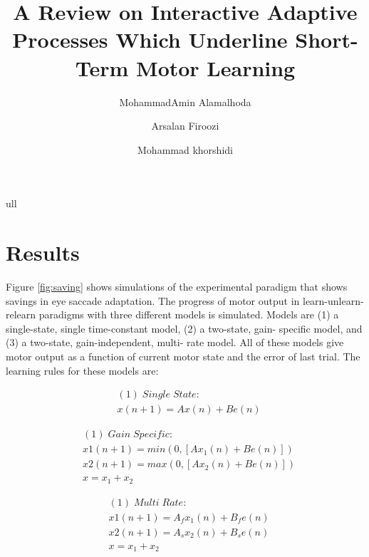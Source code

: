 \documentclass[9pt,twocolumn]{paper-template}
\title{A Review on Interactive Adaptive Processes Which Underline Short-Term Motor Learning}
\author[a]{MohammadAmin Alamalhoda}
\author[a]{Arsalan Firoozi}
\author[a]{Mohammad khorshidi}
\affil[a]{Student, EE Department, Sharif University of Technology}
\begin{document}
\maketitle
\thispagestyle{firststyle}

ull
\\
\section*{Results}


Figure \ref{fig:saving} shows simulations of the experimental paradigm that shows savings in eye saccade adaptation. The progress of motor output in learn-unlearn-relearn paradigms with three different models is simulated. Models are (1) a single-state, single time-constant model, (2) a two-state, gain- specific model, and (3) a two-state, gain-independent, multi- rate model. All of these models give motor output as a function of current motor state and the error of last trial. The learning rules for these models are:

\begin{eqnarray*}
& (1)\;Single\;State:\\
& x(n+1) = Ax(n)+Be(n)
\end{eqnarray*}

\begin{eqnarray*}
& (1)\;Gain\;Specific:\\
&x1(n+1) = min(0,[Ax_1(n)+Be(n)])\\
&x2(n+1) = max(0,[Ax_2(n)+Be(n)])\\
&x = x_1+x_2
\end{eqnarray*}


\begin{eqnarray*}
& (1)\;Multi\;Rate:\\
& x1(n+1) = A_fx_1(n) + B_fe(n)\\
& x2(n+1) = A_sx_2(n) + B_se(n)\\
&x = x_1+x_2
\end{eqnarray*}
\end{document}
